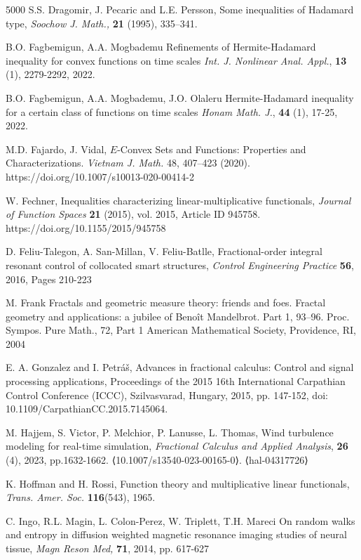 \documentclass[10pt]{article}
\begin{document}
\begin{thebibliography}{5000}
 S.S. Dragomir, J. Pecaric and L.E. Persson, Some inequalities of Hadamard type, {\it Soochow J. Math.,} {\bf21} (1995), 335–341.


 B.O. Fagbemigun, A.A. Mogbademu
Refinements of Hermite-Hadamard inequality for 
 convex functions on time scales
{\it Int. J. Nonlinear Anal. Appl.}, {\bf13} (1), 2279-2292, 2022.

 B.O. Fagbemigun, A.A. Mogbademu, J.O. Olaleru
Hermite-Hadamard inequality for a certain class of functions on time scales
{\it Honam Math. J.}, {\bf44} (1), 17-25, 2022.

 M.D. Fajardo, J. Vidal,  $E$-Convex Sets and Functions: Properties and Characterizations. {\it Vietnam J. Math.} 48, 407–423 (2020). https://doi.org/10.1007/s10013-020-00414-2

 W. Fechner, Inequalities characterizing linear-multiplicative functionals, {\it Journal of Function Spaces} {\bf21} (2015), vol. 2015, Article ID 945758. https://doi.org/10.1155/2015/945758

 D. Feliu-Talegon, A. San-Millan, V. Feliu-Batlle, Fractional-order integral resonant control of collocated smart structures, {\it Control Engineering Practice}
{\bf56}, 2016, Pages 210-223

 M. Frank
Fractals and geometric measure theory: friends and foes. Fractal geometry and applications: a jubilee of Benoît Mandelbrot. Part 1, 93–96.
Proc. Sympos. Pure Math., 72, Part 1
American Mathematical Society, Providence, RI, 2004

  E. A. Gonzalez and I. Petráš, Advances in fractional calculus: Control and signal processing applications, Proceedings of the 2015 16th International Carpathian Control Conference (ICCC), Szilvasvarad, Hungary, 2015, pp. 147-152, doi: 10.1109/CarpathianCC.2015.7145064.

 M. Hajjem, S. Victor, P. Melchior, P. Lanusse, L. Thomas, Wind turbulence modeling for real-time simulation, {\it Fractional Calculus and Applied Analysis}, {\bf26} (4), 2023,  pp.1632-1662. ⟨10.1007/s13540-023-00165-0⟩. ⟨hal-04317726⟩

 K. Hoffman and H. Rossi, Function theory and multiplicative linear functionals, {\it Trans. Amer. Soc.} {\bf 116}(543), 1965.

 C. Ingo, R.L. Magin, L. Colon-Perez, W. Triplett, T.H. Mareci
On random walks and entropy in diffusion weighted magnetic resonance imaging studies of neural tissue,
{\it Magn Reson Med,} {\bf 71}, 2014, pp. 617-627


\end{thebibliography}
\end{document}
